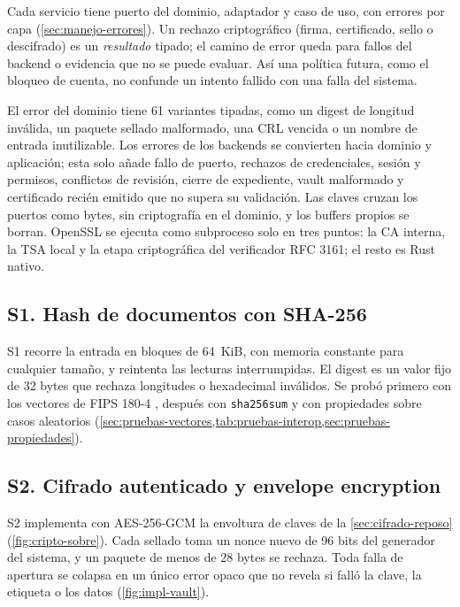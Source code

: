 Cada servicio tiene puerto del dominio, adaptador y caso de uso, con errores por capa (\cref{sec:manejo-errores}). Un rechazo criptográfico (firma, certificado, sello o descifrado) es un \emph{resultado} tipado; el camino de error queda para fallos del backend o evidencia que no se puede evaluar. Así una política futura, como el bloqueo de cuenta, no confunde un intento fallido con una falla del sistema.

El error del dominio tiene 61 variantes tipadas, como un digest de longitud inválida, un paquete sellado malformado, una CRL vencida o un nombre de entrada inutilizable. Los errores de los backends se convierten hacia dominio y aplicación; esta solo añade fallo de puerto, rechazos de credenciales, sesión y permisos, conflictos de revisión, cierre de expediente, vault malformado y certificado recién emitido que no supera su validación. Las claves cruzan los puertos como bytes, sin criptografía en el dominio, y los buffers propios se borran. OpenSSL se ejecuta como subproceso solo en tres puntos: la CA interna, la TSA local y la etapa criptográfica del verificador RFC 3161; el resto es Rust nativo.

\subsection{S1. Hash de documentos con SHA-256}\label{sec:impl-s1-hash}

S1 recorre la entrada en bloques de 64~KiB, con memoria constante para cualquier tamaño, y reintenta las lecturas interrumpidas. El digest es un valor fijo de 32 bytes que rechaza longitudes o hexadecimal inválidos. Se probó primero con los vectores de FIPS 180-4 \cite{nist2015fips1804}, después con \texttt{sha256sum} y con propiedades sobre casos aleatorios (\cref{sec:pruebas-vectores,tab:pruebas-interop,sec:pruebas-propiedades}).

\subsection{S2. Cifrado autenticado y envelope encryption}\label{sec:impl-s2-cifrado}

S2 implementa con AES-256-GCM \cite{dworkin2007,mcgrew2008} la envoltura de claves \cite{dworkin2012} de la \cref{sec:cifrado-reposo} (\cref{fig:cripto-sobre}). Cada sellado toma un nonce nuevo de 96 bits del generador del sistema, y un paquete de menos de 28 bytes se rechaza. Toda falla de apertura se colapsa en un único error opaco que no revela si falló la clave, la etiqueta o los datos (\cref{fig:impl-vault}).

